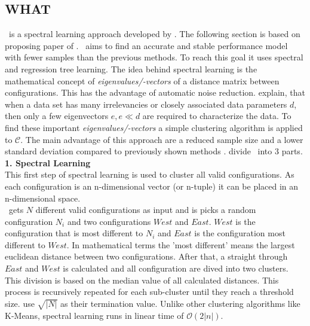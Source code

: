 \subsection{WHAT}\label{sec:WHAT}
\WHAT~is a spectral learning approach developed by \citet{FasterDiscoveryofFasterSystemConfigurationsSiegmund2017}. The following section is based on proposing paper of \citet{FasterDiscoveryofFasterSystemConfigurationsSiegmund2017}. \WHAT~aims to find an accurate and stable performance model with fewer samples than the previous methods. To reach this goal it uses spectral and regression tree learning. The idea behind spectral learning is the mathematical concept of \textit{eigenvalues/-vectors} of a distance matrix between configurations. This has the advantage of automatic noise reduction.
 \citet{FasterDiscoveryofFasterSystemConfigurationsSiegmund2017} explain, that when a data set has many irrelevancies or closely associated data parameters $d$, then only a few eigenvectors $e, e\ll d$ are required to characterize the data. To find these important \textit{eigenvalues/-vectors} a simple clustering algorithm is applied to $\mathcal{C}$.
The main advantage of this approach are a reduced sample size and a lower standard deviation compared to previously shown methods \cite{FasterDiscoveryofFasterSystemConfigurationsSiegmund2017}.
\citet{FasterDiscoveryofFasterSystemConfigurationsSiegmund2017} divide \WHAT~into 3 parts.
\\

\noindent
\textbf{1. Spectral Learning}\\
\noindent
This first step of spectral learning is used to cluster all valid configurations. As each configuration is an n-dimensional vector (or n-tuple) it can be placed in an n-dimensional space.\\
\WHAT~gets $N$ different valid configurations as input and is picks a random configuration $N_i$ and two configurations $West$ and  $East$. $West$ is the configuration that is most different to $N_i$ and $East$ is the configuration most different to $West$. In mathematical terms the 'most different' means the largest euclidean distance between two configurations. After that, a straight through $East$ and $West$ is calculated and all configuration are dived into two clusters. This division is based on the median value of all calculated distances. This process is recursively repeated for each sub-cluster until they reach a threshold size. \citet{FasterDiscoveryofFasterSystemConfigurationsSiegmund2017} use $\sqrt{|N|}$ as their termination value. Unlike other clustering algorithms like K-Means, spectral learning runs in linear time of  $\mathcal{O}(2|n|)$.
\\

